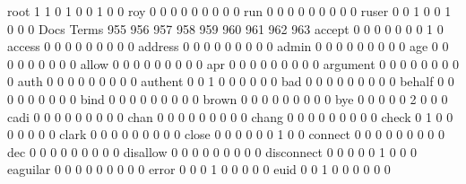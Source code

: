 \documentclass[compress,8pt]{beamer}
\begin{document}
\begin{frame}
\begin{Schunk}
  root                                       1   1   0   1   0   0   1   0   0
  roy                                        0   0   0   0   0   0   0   0   0
  run                                        0   0   0   0   0   0   0   0   0
  ruser                                      0   0   1   0   0   1   0   0   0
                                          Docs
Terms                                      955 956 957 958 959 960 961 962 963
  accept                                     0   0   0   0   0   0   0   1   0
  access                                     0   0   0   0   0   0   0   0   0
  address                                    0   0   0   0   0   0   0   0   0
  admin                                      0   0   0   0   0   0   0   0   0
  age                                        0   0   0   0   0   0   0   0   0
  allow                                      0   0   0   0   0   0   0   0   0
  apr                                        0   0   0   0   0   0   0   0   0
  argument                                   0   0   0   0   0   0   0   0   0
  auth                                       0   0   0   0   0   0   0   0   0
  authent                                    0   0   1   0   0   0   0   0   0
  bad                                        0   0   0   0   0   0   0   0   0
  behalf                                     0   0   0   0   0   0   0   0   0
  bind                                       0   0   0   0   0   0   0   0   0
  brown                                      0   0   0   0   0   0   0   0   0
  bye                                        0   0   0   0   0   2   0   0   0
  cadi                                       0   0   0   0   0   0   0   0   0
  chan                                       0   0   0   0   0   0   0   0   0
  chang                                      0   0   0   0   0   0   0   0   0
  check                                      0   1   0   0   0   0   0   0   0
  clark                                      0   0   0   0   0   0   0   0   0
  close                                      0   0   0   0   0   0   1   0   0
  connect                                    0   0   0   0   0   0   0   0   0
  dec                                        0   0   0   0   0   0   0   0   0
  disallow                                   0   0   0   0   0   0   0   0   0
  disconnect                                 0   0   0   0   0   1   0   0   0
  eaguilar                                   0   0   0   0   0   0   0   0   0
  error                                      0   0   0   1   0   0   0   0   0
  euid                                       0   0   1   0   0   0   0   0   0

\end{Schunk}
\end{frame}
\end{document}
